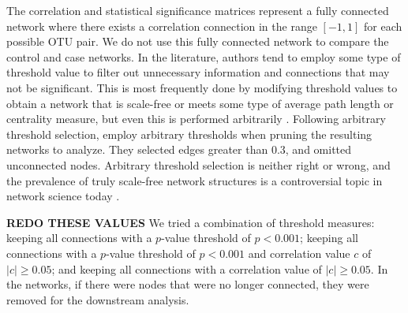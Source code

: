 The correlation and statistical significance matrices represent a fully connected network where there exists a correlation connection in the range $[-1,1]$ for each possible \acrshort{OTU} pair. We do not use this fully connected network to compare the control and case networks. In the literature, authors tend to employ some type of threshold value to filter out unnecessary information and connections that may not be significant. This is most frequently done by modifying threshold values to obtain a network that is scale-free or meets some type of average path length or centrality measure, but even this is performed arbitrarily \citep{Perkins2009, Batushansky2016, Romero-Campero2016}. Following arbitrary threshold selection, \citeauthor{Friedman2012}  employ arbitrary thresholds when pruning the resulting networks to analyze. They selected edges greater than 0.3, and omitted unconnected nodes. Arbitrary threshold selection is neither right or wrong, and the prevalence of truly scale-free network structures is a controversial topic in network science today \citep{Broido2019, Barabasi2018, Holme2019}. 

\textbf{REDO THESE VALUES} We tried a combination of threshold measures: keeping all connections with a $p$-value threshold of $p<0.001$; keeping all connections with a $p$-value threshold of $p<0.001$ and correlation value $c$ of $|c| \geq 0.05$; and keeping all connections with a correlation value of $|c| \geq 0.05$. In the networks, if there were nodes that were no longer connected, they were removed for the downstream analysis.

